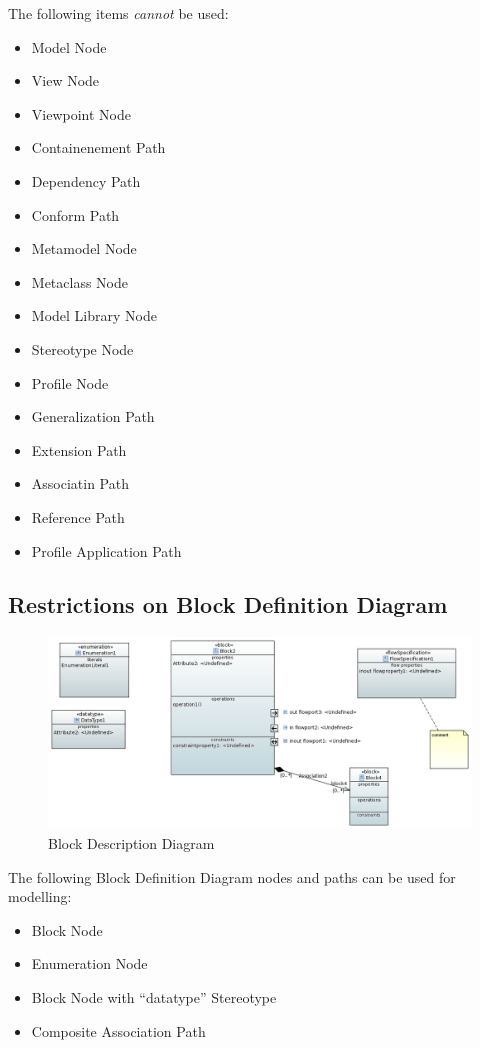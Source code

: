 The following items \emph{cannot} be used:
\begin{itemize}
\item Model Node
\item View Node
\item Viewpoint Node
\item Containenement Path
\item Dependency Path
\item Conform Path
\item Metamodel Node
\item Metaclass Node
\item Model Library Node
\item Stereotype Node
\item Profile Node
\item Generalization Path
\item Extension Path
\item Associatin Path
\item Reference Path
\item Profile Application Path
\end{itemize}

\subsection{Restrictions on Block Definition Diagram}



\begin{figure}[ht]
  \centering
  \includegraphics[width=\textwidth]{images/BDDDiagram.PNG}
  \caption{Block Description Diagram}
  \label{fig:Bdd}
\end{figure}



The following Block Definition Diagram nodes and paths can be used for
modelling:
\begin{itemize}
\item Block Node 
\item Enumeration Node 
\item Block Node with ``datatype'' Stereotype 
\item Composite Association Path 
\end{itemize}

